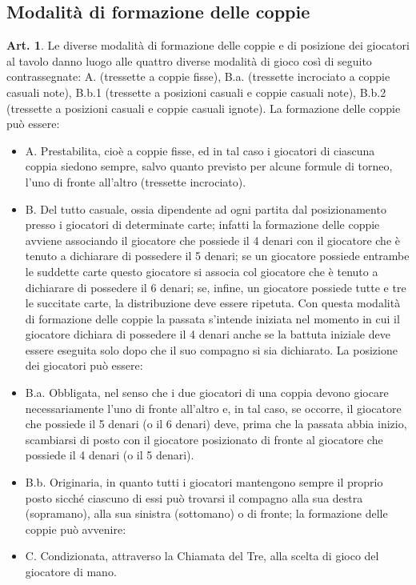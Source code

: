 \documentclass[italian,a4paper]{article}
\theoremstyle{definition}
\newtheorem{art}{Art.}
\begin{document}
\subsection{Modalità di formazione delle coppie}
\begin{art}
Le diverse modalità di formazione delle coppie e di posizione dei giocatori
al tavolo danno luogo alle quattro diverse modalità di gioco così di seguito
contrassegnate: A. (tressette a coppie fisse), B.a. (tressette incrociato a coppie casuali note), B.b.1 (tressette a posizioni casuali e coppie casuali note), B.b.2 (tressette a posizioni casuali e coppie casuali ignote).
La formazione delle coppie può essere:
\begin{itemize}
\item       A. Prestabilita, cioè a coppie fisse, ed in tal caso i giocatori di ciascuna coppia siedono sempre, salvo quanto previsto per alcune formule di torneo, l'uno di fronte all'altro (tressette incrociato).
\item       B. Del tutto casuale, ossia dipendente ad ogni partita dal posizionamento presso i giocatori di determinate carte; infatti la formazione delle coppie avviene associando il giocatore che possiede il 4 denari con il giocatore che è tenuto a dichiarare di possedere il 5 denari; se un giocatore possiede entrambe le suddette carte questo giocatore si associa col giocatore che è tenuto a dichiarare di possedere il 6 denari; se, infine, un giocatore possiede tutte e tre le succitate carte, la distribuzione deve essere ripetuta. Con questa modalità di formazione delle coppie la passata s'intende iniziata nel momento in cui il giocatore dichiara di possedere il 4 denari anche se la battuta iniziale deve essere eseguita solo dopo che il suo compagno si sia dichiarato. La posizione dei giocatori può essere:
\item B.a. Obbligata, nel senso che i due giocatori di una coppia devono giocare necessariamente l'uno di fronte all'altro e, in tal caso, se occorre, il giocatore che possiede il 5 denari (o il 6 denari) deve, prima che la passata abbia inizio, scambiarsi di posto con il giocatore posizionato di fronte al giocatore che possiede il 4 denari (o il 5 denari).
\item  B.b. Originaria, in quanto tutti i giocatori mantengono sempre il proprio posto sicché ciascuno di essi può trovarsi il compagno alla sua destra (sopramano), alla sua sinistra (sottomano) o di fronte; la formazione delle coppie può avvenire:
\item   C. Condizionata, attraverso la Chiamata del Tre, alla scelta di gioco del giocatore di mano.
    \end{itemize}
\end{art}
\end{document}
